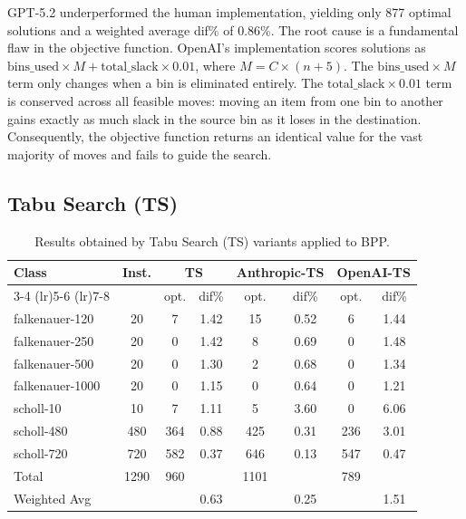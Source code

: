 \documentclass[11pt]{article}
\begin{document}
GPT-5.2 underperformed the human implementation, yielding only 877 optimal solutions 
and a weighted average dif\% of 0.86\%. The root cause is a fundamental flaw in the 
objective function. OpenAI's implementation scores solutions as $\text{bins\_used} 
\times M + \text{total\_slack} \times 0.01$, where $M = C \times (n + 5)$. The 
$\text{bins\_used} \times M$ term only changes when a bin is eliminated entirely. The 
$\text{total\_slack} \times 0.01$ term is conserved across all feasible moves: moving 
an item from one bin to another gains exactly as much slack in the source bin as it 
loses in the destination. Consequently, the objective function returns an identical 
value for the vast majority of moves and fails to guide the search.


\subsection{Tabu Search (TS)}
\begin{table}[H]
\centering
\caption{Results obtained by Tabu Search (TS) variants applied to BPP.}
\label{tab:tabu-comparison}
\begin{tabular}{l c cc cc cc}
\toprule
\multirow{2}{*}{Class} & \multirow{2}{*}{Inst.} & \multicolumn{2}{c}{TS} & \multicolumn{2}{c}{Anthropic-TS} & \multicolumn{2}{c}{OpenAI-TS} \\
\cmidrule(lr){3-4} \cmidrule(lr){5-6} \cmidrule(lr){7-8}
 & & opt. & dif\% & opt. & dif\% & opt. & dif\% \\
\midrule
falkenauer-120  & 20   & 7    & 1.42 & 15   & 0.52 & 6    & 1.44 \\
falkenauer-250  & 20   & 0    & 1.42 & 8    & 0.69 & 0    & 1.48 \\
falkenauer-500  & 20   & 0    & 1.30 & 2    & 0.68 & 0    & 1.34 \\
falkenauer-1000 & 20   & 0    & 1.15 & 0    & 0.64 & 0    & 1.21 \\
scholl-10       & 10   & 7    & 1.11 & 5    & 3.60 & 0    & 6.06 \\
scholl-480      & 480  & 364  & 0.88 & 425  & 0.31 & 236  & 3.01 \\
scholl-720      & 720  & 582  & 0.37 & 646  & 0.13 & 547  & 0.47 \\
\midrule
Total           & 1290 & 960  &      & 1101 &      & 789  &      \\
Weighted Avg    &      &      & 0.63 &      & 0.25 &      & 1.51 \\
\bottomrule
\end{tabular}
\end{table}
\end{document}
